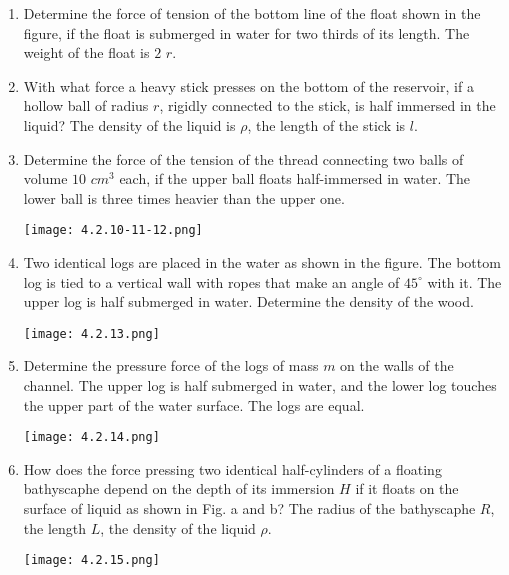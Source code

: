 \documentclass{article}
\begin{document}
\begin{enumerate}[label=4.2.\arabic*]
\item Determine the force of tension of the bottom line of the float shown in the figure, if the float is submerged in water for two thirds of its length. The weight of the float is $2$ $r$.

\item With what force a heavy stick presses on the bottom of the reservoir, if a hollow ball of radius $r$, rigidly connected to the stick, is half immersed in the liquid? The density of the liquid is $\rho$, the length of the stick is $l$.   

\item Determine the force of the tension of the thread connecting two balls of volume $10$ $cm^3$ each, if the upper ball floats half-immersed in water. The lower ball is three times heavier than the upper one.

\begin{center}
    \texttt{[image: 4.2.10-11-12.png]}
\end{center}


\item Two identical logs are placed in the water as shown in the figure. The bottom log is tied to a vertical wall with ropes that make an angle of $45^{\circ}$ with it. The upper log is half submerged in water. Determine the density of the wood.

\begin{center}
    \texttt{[image: 4.2.13.png]}
\end{center}


\item Determine the pressure force of the logs of mass $m$ on the walls of the channel. The upper log is half submerged in water, and the lower log touches the upper part of the water surface. The logs are equal. 
\begin{center}
    \texttt{[image: 4.2.14.png]}
\end{center}

\item How does the force pressing two identical half-cylinders of a floating bathyscaphe depend on the depth of its immersion $H$ if it floats on the surface of liquid as shown in Fig. a and b? The radius of the bathyscaphe $R$, the length $L$, the density of the liquid $\rho$.   
\begin{center}
    \texttt{[image: 4.2.15.png]}
\end{center}


\end{enumerate}
\end{document}
